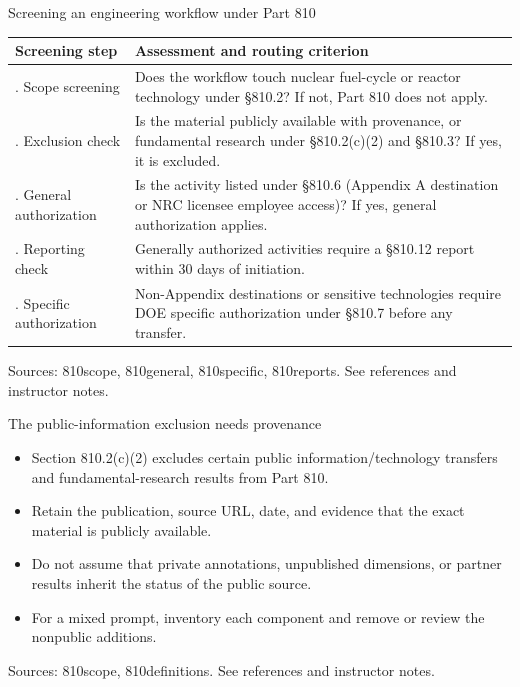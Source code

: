 \documentclass[aspectratio=169,11pt]{beamer}
\begin{document}
\begin{frame}[t,fragile]{Screening an engineering workflow under Part 810}
\fontsize{10.5}{12.5}\selectfont\setlength{\tabcolsep}{4pt}\renewcommand{\arraystretch}{1.15}
\begin{tabular}{>{\raggedright\arraybackslash}p{}>{\raggedright\arraybackslash}p{}}
\toprule
\textbf{Screening step} & \textbf{Assessment and routing criterion} \\ \midrule
1. Scope screening & Does the workflow touch nuclear fuel-cycle or reactor technology under \S{}810.2? If not, Part 810 does not apply. \\[2pt]
2. Exclusion check & Is the material publicly available with provenance, or fundamental research under \S{}810.2(c)(2) and \S{}810.3? If yes, it is excluded. \\[2pt]
3. General authorization & Is the activity listed under \S{}810.6 (Appendix A destination or NRC licensee employee access)? If yes, general authorization applies. \\[2pt]
4. Reporting check & Generally authorized activities require a \S{}810.12 report within 30 days of initiation. \\[2pt]
5. Specific authorization & Non-Appendix destinations or sensitive technologies require DOE specific authorization under \S{}810.7 before any transfer. \\[2pt]
\bottomrule\end{tabular}\par\vspace{2mm}
\vfill{\fontsize{6.5}{8}\selectfont\color{UTgray} Sources: 810scope, 810general, 810specific, 810reports. See references and instructor notes.\par}
\end{frame}
\begin{frame}[t,fragile]{The public-information exclusion needs provenance}
\fontsize{11.5}{14}\selectfont
\begin{itemize}\setlength{\itemsep}{2mm}
\item Section 810.2(c)(2) excludes certain public information/technology transfers and fundamental-research results from Part 810.
\item Retain the publication, source URL, date, and evidence that the exact material is publicly available.
\item Do not assume that private annotations, unpublished dimensions, or partner results inherit the status of the public source.
\item For a mixed prompt, inventory each component and remove or review the nonpublic additions.
\end{itemize}
\vfill{\fontsize{6.5}{8}\selectfont\color{UTgray} Sources: 810scope, 810definitions. See references and instructor notes.\par}
\end{frame}
\end{document}
